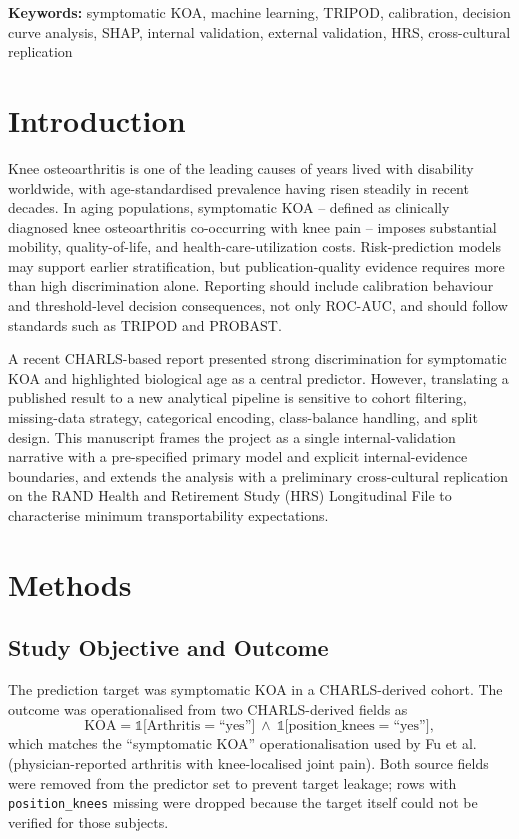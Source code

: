 \documentclass[11pt,a4paper]{article}
\begin{document}
\textbf{Keywords:} symptomatic KOA, machine learning, TRIPOD, calibration, decision curve analysis,
SHAP, internal validation, external validation, HRS, cross-cultural replication

\section{Introduction}
Knee osteoarthritis is one of the leading causes of years lived with disability worldwide, with
age-standardised prevalence having risen steadily in recent decades\cite{Safiri2020}. In aging
populations, symptomatic KOA -- defined as clinically diagnosed knee osteoarthritis co-occurring with
knee pain -- imposes substantial mobility, quality-of-life, and health-care-utilization costs.
Risk-prediction models may support earlier stratification, but publication-quality evidence requires
more than high discrimination alone. Reporting should include calibration behaviour and threshold-level
decision consequences, not only ROC-AUC, and should follow standards such as TRIPOD\cite{Collins2015}
and PROBAST\cite{Wolff2019}.

A recent CHARLS-based report\cite{Fu2025} presented strong discrimination for symptomatic KOA and
highlighted biological age as a central predictor. However, translating a published result to a new
analytical pipeline is sensitive to cohort filtering, missing-data strategy, categorical encoding,
class-balance handling, and split design. This manuscript frames the project as a single
internal-validation narrative with a pre-specified primary model and explicit internal-evidence
boundaries, and extends the analysis with a preliminary cross-cultural replication on the RAND Health
and Retirement Study (HRS) Longitudinal File to characterise minimum transportability expectations.

\section{Methods}

\subsection{Study Objective and Outcome}
The prediction target was symptomatic KOA in a CHARLS-derived cohort. The outcome was operationalised
from two CHARLS-derived fields as
\[
\text{KOA} = \mathbb{1}\bigl[\text{Arthritis} = \text{``yes''}\bigr]\ \wedge\
\mathbb{1}\bigl[\text{position\_knees} = \text{``yes''}\bigr],
\]
\noindent which matches the ``symptomatic KOA'' operationalisation used by Fu et al.\cite{Fu2025}
(physician-reported arthritis with knee-localised joint pain). Both source fields were removed from the
predictor set to prevent target leakage; rows with \texttt{position\_knees} missing were dropped because
the target itself could not be verified for those subjects.
\end{document}
